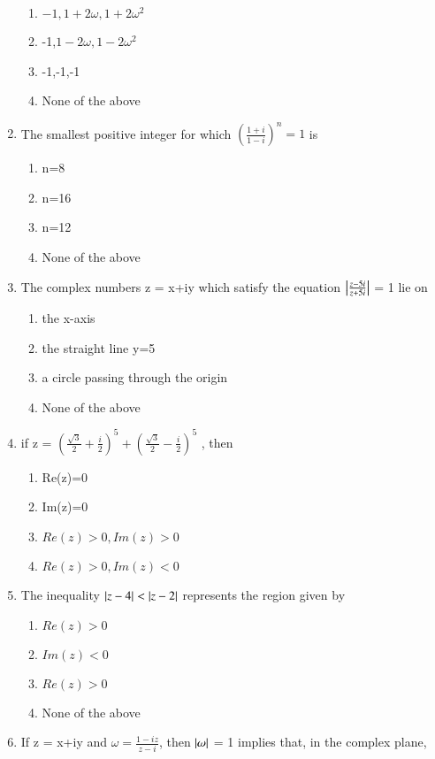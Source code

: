 \begin{enumerate}[label=\arabic*.,ref=\thesubsection.\theenumi]
\begin{enumerate}
    \item  $-1,1+2\omega,1+2\omega^2$
    \item  -1,$1-2\omega,1-2\omega^2$
    \item  -1,-1,-1
    \item  None of the above
    \end{enumerate}
    \item The smallest positive integer for which
     $( {\frac{1+i}{1-i}})^n=1$ is 
     \begin{enumerate}
    \item  n=8
    \item  n=16
    \item  n=12
    \item  None of the above
    \end{enumerate}
    \item The complex numbers z = x+iy which satisfy the equation 
    $\left\vert\frac{z-5i}{z+5i}\right\vert$ = 1 lie on
    \begin{enumerate}
    \item  the x-axis
    \item  the straight line y=5
    \item   a circle passing through the origin
    \item  None of the above
    \end{enumerate}
    \item if z = $(\frac{\sqrt3}{2}+\frac{i}{2})^5+(\frac{\sqrt3}{2}-\frac{i}{2})^5 $ , then 
     \begin{enumerate}
    \item   Re(z)=0
    \item   Im(z)=0    
    \item  $Re(z) > 0, Im(z) > 0$
    \item  $Re(z)> 0, Im(z)< 0$
    \end{enumerate}
    \item The inequality $\left\vert z-4\right\vert < \left\vert z-2\right\vert$ represents the region given by
    \begin{enumerate}
    \item  $Re(z) > 0$
    \item  $Im(z) < 0$
    \item  $Re(z) > 0$
    \item  None of the above
    \end{enumerate}
     \item If z = x+iy and $\omega = \frac{1-iz}{z-i}$, then $\left\vert\omega\right\vert$ = 1 implies that, in the complex plane,
    \begin{enumerate}

\end{enumerate}
\end{enumerate}
